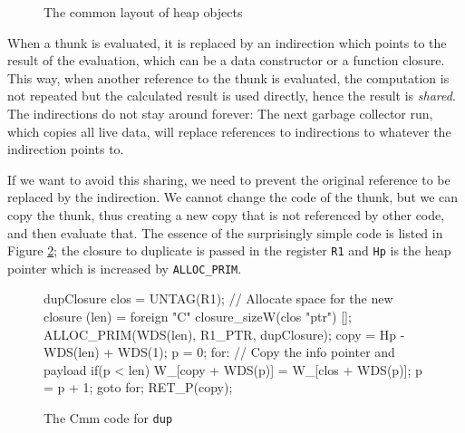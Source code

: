 \documentclass[preprint]{sigplanconf}
\theoremstyle{nonumberplain}
\newcommand{\li}{\lstinline[style=Haskell]}
\newcommand{\ci}{\lstinline[style=Cmm]}
\begin{document}
\def\ux{2.2cm}\def\uy{0.6cm}
\begin{figure}
\begin{center}
\end{center}
\caption{The common layout of heap objects}
\label{fig:heap}
\end{figure}

When a thunk is evaluated, it is replaced by an indirection which points to the result of the evaluation, which can be a data constructor or a function closure. This way, when another reference to the thunk is evaluated, the computation is not repeated but the calculated result is used directly, hence the result is \emph{shared}. The indirections do not stay around forever: The next garbage collector run, which copies all live data, will replace references to indirections to whatever the indirection points to.

If we want to avoid this sharing, we need to prevent the original reference to be replaced by the indirection. We cannot change the code of the thunk, but we can copy the thunk, thus creating a new copy that is not referenced by other code, and then evaluate that.
The essence of the surprisingly simple code is listed in Figure \ref{fig:dupcode}; the closure to duplicate is passed in the register \ci-R1- and \ci-Hp- is the heap pointer which is increased by \ci-ALLOC_PRIM-.

\begin{figure}
\begin{cmm}
dupClosure {
    clos = UNTAG(R1);
    // Allocate space for the new closure
    (len) = foreign "C" closure_sizeW(clos "ptr") [];
    ALLOC_PRIM(WDS(len), R1_PTR, dupClosure);
    copy = Hp - WDS(len) + WDS(1);
    p = 0;
    for: // Copy the info pointer and payload
    if(p < len) {
        W_[copy + WDS(p)] = W_[clos + WDS(p)];
        p = p + 1;
        goto for;
    }
    RET_P(copy);
}
\end{cmm}
\caption{The Cmm code for \li-dup-}
\label{fig:dupcode}
\end{figure}
\end{document}
